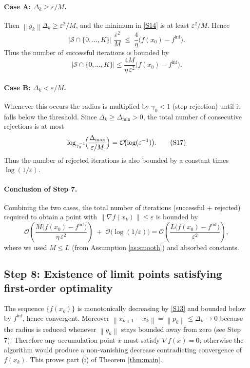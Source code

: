 \documentclass{article}
\newcommand{\norm}[1]{\left\lVert#1\right\rVert}
\begin{document}
\paragraph{Case A: $\Delta_{k}\ge \varepsilon/M$.}
Then $\norm{g_{k}}\Delta_{k}\ge \varepsilon^{2}/M$, and the minimum in \eqref{S14} is at least $\varepsilon^{2}/M$.  Hence
\[
|\mathcal{S}\cap\{0,\dots,K\}|\;\frac{\varepsilon^{2}}{M}
\;\le\;
\frac{4}{\eta}\bigl(f(x_{0})-f^{\inf}\bigr).
\tag{S15}
\]
Thus the number of successful iterations is bounded by
\[
|\mathcal{S}\cap\{0,\dots,K\}|
\le
\frac{4M}{\eta\,\varepsilon^{2}}\bigl(f(x_{0})-f^{\inf}\bigr).
\tag{S16}
\]

\paragraph{Case B: $\Delta_{k}< \varepsilon/M$.}
Whenever this occurs the radius is multiplied by $\gamma_{0}<1$ (step rejection) until it falls below the threshold.  Since $\Delta_{k}\ge\Delta_{\min}>0$, the total number of consecutive rejections is at most
\[
\log_{\gamma_{0}^{-1}}\!\Bigl(\frac{\Delta_{\max}}{\varepsilon/M}\Bigr)
=
\mathcal{O}\!\bigl(\log(\varepsilon^{-1})\bigr).
\tag{S17}
\]
Thus the number of rejected iterations is also bounded by a constant times $\log(1/\varepsilon)$.

\paragraph{Conclusion of Step 7.}
Combining the two cases, the total number of iterations (successful + rejected) required to obtain a point with $\norm{\nabla f(x_{k})}\le\varepsilon$ is bounded by
\[
\mathcal{O}\!\left(\frac{M\bigl(f(x_{0})-f^{\inf}\bigr)}{\eta\,\varepsilon^{2}}\right)
\;+\;
\mathcal{O}\!\bigl(\log(1/\varepsilon)\bigr)
=
\mathcal{O}\!\left(\frac{L\bigl(f(x_{0})-f^{\inf}\bigr)}{\varepsilon^{2}}\right),
\tag{S18}
\]
where we used $M\le L$ (from Assumption \ref{as:smooth}) and absorbed constants.

\subsection*{Step 8: Existence of limit points satisfying first‑order optimality}
The sequence $\{f(x_{k})\}$ is monotonically decreasing by \eqref{S13} and bounded below by $f^{\inf}$, hence convergent.  Moreover $\norm{x_{k+1}-x_{k}}=\norm{p_{k}}\le\Delta_{k}\to0$ because the radius is reduced whenever $\norm{g_{k}}$ stays bounded away from zero (see Step 7).  Therefore any accumulation point $\bar x$ must satisfy $\nabla f(\bar x)=0$; otherwise the algorithm would produce a non‑vanishing decrease contradicting convergence of $f(x_{k})$.  This proves part (i) of Theorem \ref{thm:main}.
\end{document}
